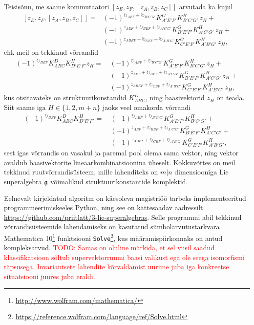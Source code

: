 Teisisõnu, me saame kommutaatori $\left[ z_E, z_F, [z_A, z_B, z_C] \right]$
arvutada ka kujul
\begin{align*}
    \left[ z_E, z_F, [z_A, z_B, z_C] \right] = 
    &(-1)^{\circlearrowright_{AEF} + \circlearrowright_{B'C'G'}}
        K_{A' E' F'}^G K_{B' C' G'}^H
        \,z_H + \\
    &(-1)^{z_{AEF} + \circlearrowright_{BEF} + \circlearrowright_{A'C'G'}}
        K_{B' E' F'}^G K_{A' C' G'}^H
        \,z_H + \\
    &(-1)^{z_{ABEF} + \circlearrowright_{CEF} + \circlearrowright_{A'B'G'}}
        K_{C' E' F'}^G K_{A' B' G'}^H
        \,z_H,
\end{align*}
ehk meil on tekkinud võrrandid
\begin{align*}
    (-1)^{\circlearrowright_{DEF}} K_{ABC}^D K_{D' E' F'}^H z_H =\ 
    &(-1)^{\circlearrowright_{AEF} + \circlearrowright_{B'C'G'}}
        K_{A' E' F'}^G K_{B' C' G'}^H
        \,z_H + \\
    &(-1)^{z_{AEF} + \circlearrowright_{BEF} + \circlearrowright_{A'C'G'}}
        K_{B' E' F'}^G K_{A' C' G'}^H
        \,z_H + \\
    &(-1)^{z_{ABEF} + \circlearrowright_{CEF} + \circlearrowright_{A'B'G'}}
        K_{C' E' F'}^G K_{A' B' G'}^H
        \,z_H,
\end{align*}
kus otsitavateks on struktuurikonstandid $K_{ABC}^D$, ning baasivektorid
$z_H$ on teada. Siit saame iga $H \in \{ 1, 2, m+n \}$ jaoks veel omakorda
võrrandi
\begin{align*}
    (-1)^{\circlearrowright_{DEF}} K_{ABC}^D K_{D' E' F'}^H =\ 
    &(-1)^{\circlearrowright_{AEF} + \circlearrowright_{B'C'G'}}
        K_{A' E' F'}^G K_{B' C' G'}^H + \\
    &(-1)^{z_{AEF} + \circlearrowright_{BEF} + \circlearrowright_{A'C'G'}}
        K_{B' E' F'}^G K_{A' C' G'}^H + \\
    &(-1)^{z_{ABEF} + \circlearrowright_{CEF} + \circlearrowright_{A'B'G'}}
        K_{C' E' F'}^G K_{A' B' G'}^H,
\end{align*}
sest igas võrrandis on vasakul ja paremal pool olema sama vektor, ning
vektor avaldub baasivektorite lineaarkombinatsioonina üheselt.
Kokkuvõttes on meil tekkinud ruutvõrrandisüsteem, mille lahenditeks on
$m|n$ dimensiooniga Lie superalgebra $\mathfrak{g}$ võimalikud struktuurikonstantide
komplektid.

Eelnevalt kirjeldatud algoritm on käesoleva magistriöö tarbeks
implementeeritud programmeerimiskeeles Python, ning see on kättesaadav
aadressilt \url{https://github.com/priitlatt/3-lie-superalgebras}.
Selle programmi abil tekkinud võrrandisüsteemide lahendamiseks on
kasutatud sümbolarvutustarkvara
Mathematica 10\footnote{\url{http://www.wolfram.com/mathematica/}}
funktsiooni \verb+Solve+\footnote{\url{https://reference.wolfram.com/language/ref/Solve.html}}, kus määramispiirkonnaks on antud
kompleksarvud. \textcolor{red}{TODO: Samas on oluline märkida, et sel viisil
saadud klassifikatsioon sõltub supervektorruumi baasi valikust ega ole seega
isomorfismi täpsusega. Invariantsete lahendite kõrvaldamist uurime juba iga
konkreetse situatsiooni juures juba eraldi.}

